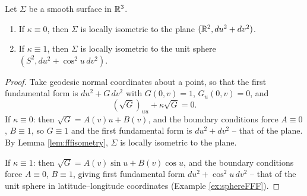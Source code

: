 \documentclass[a4paper]{scrartcl}
\begin{document}
\begin{proposition}
    Let $\Sigma$ be a smooth surface in $\mathbb{R}^3$.
    \begin{enumerate}[label=(\roman*)]
        \item If $\kappa \equiv 0$, then $\Sigma$ is locally isometric to the plane $(\mathbb{R}^2, du^2 + dv^2)$.
        \item If $\kappa \equiv 1$, then $\Sigma$ is locally isometric to the unit sphere $(S^2, du^2 + \cos^2 u\, dv^2)$.
    \end{enumerate}
\end{proposition}
\begin{proof}
    Take geodesic normal coordinates about a point, so that the first fundamental form is $du^2 + G\, dv^2$ with $G(0, v) = 1$, $G_u(0, v) = 0$, and
    $$
    \left(\sqrt{G}\right)_{uu} + \kappa \sqrt{G} = 0.
    $$
    If $\kappa \equiv 0$: then $\sqrt{G} = A(v) u + B(v)$, and the boundary conditions force $A \equiv 0$, $B \equiv 1$, so $G \equiv 1$ and the first fundamental form is $du^2 + dv^2$ -- that of the plane. By Lemma \ref{lem:fffisometry}, $\Sigma$ is locally isometric to the plane.

    If $\kappa \equiv 1$: then $\sqrt{G} = A(v)\sin u + B(v) \cos u$, and the boundary conditions force $A \equiv 0$, $B \equiv 1$, giving first fundamental form $du^2 + \cos^2 u \, dv^2$ -- that of the unit sphere in latitude--longitude coordinates (Example \ref{ex:sphereFFF}).
\end{proof}
\end{document}
